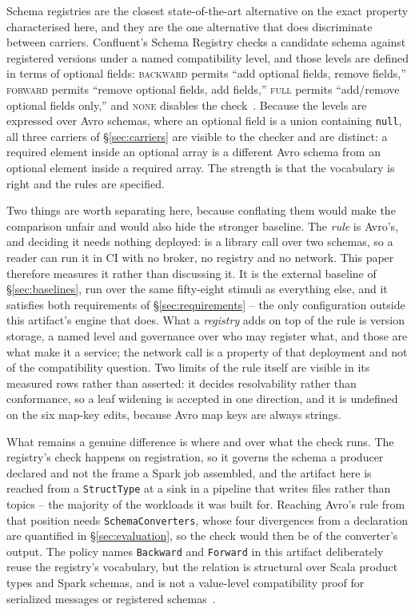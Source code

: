 Schema registries are the closest state-of-the-art alternative on the exact property characterised here, and they are the one alternative that does discriminate between carriers. Confluent's Schema Registry checks a candidate schema against registered versions under a named compatibility level, and those levels are defined in terms of optional fields: \textsc{backward} permits ``add optional fields, remove fields,'' \textsc{forward} permits ``remove optional fields, add fields,'' \textsc{full} permits ``add/remove optional fields only,'' and \textsc{none} disables the check~\cite{avro_compatibility}. Because the levels are expressed over Avro schemas, where an optional field is a union containing \texttt{null}, all three carriers of \S\ref{sec:carriers} are visible to the checker and are distinct: a required element inside an optional array is a different Avro schema from an optional element inside a required array. The strength is that the vocabulary is right and the rules are specified.

Two things are worth separating here, because conflating them would make the comparison unfair and would also hide the stronger baseline. The \emph{rule} is Avro's, and deciding it needs nothing deployed:  is a library call over two schemas, so a reader can run it in CI with no broker, no registry and no network. This paper therefore measures it rather than discussing it. It is the external baseline of \S\ref{sec:baselines}, run over the same fifty-eight stimuli as everything else, and it satisfies both requirements of \S\ref{sec:requirements} -- the only configuration outside this artifact's engine that does. What a \emph{registry} adds on top of the rule is version storage, a named level and governance over who may register what, and those are what make it a service; the network call is a property of that deployment and not of the compatibility question. Two limits of the rule itself are visible in its measured rows rather than asserted: it decides resolvability rather than conformance, so a leaf widening is accepted in one direction, and it is undefined on the six map-key edits, because Avro map keys are always strings.

What remains a genuine difference is where and over what the check runs. The registry's check happens on registration, so it governs the schema a producer declared and not the frame a Spark job assembled, and the artifact here is reached from a \texttt{StructType} at a sink in a pipeline that writes files rather than topics -- the majority of the workloads it was built for. Reaching Avro's rule from that position needs \texttt{SchemaConverters}, whose four divergences from a declaration are quantified in \S\ref{sec:evaluation}, so the check would then be of the converter's output. The policy names \texttt{Backward} and \texttt{Forward} in this artifact deliberately reuse the registry's vocabulary, but the relation is structural over Scala product types and Spark schemas, and is not a value-level compatibility proof for serialized messages or registered schemas~\cite{avro_spec}.

